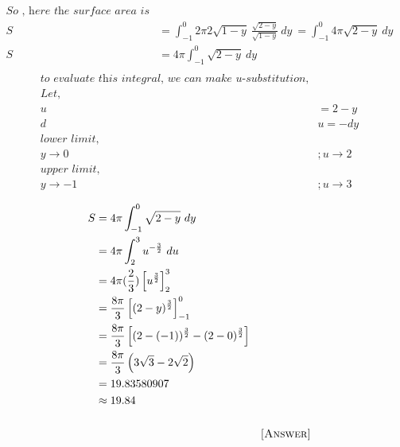 \documentclass[12pt]{article}
\begin{document}
\begin{align*}
\textit{So , here the surface area is}\\
    S &= \int_{-1}^{0} 2\pi 2\sqrt{1-y} \ \frac{\sqrt{2-y}}{\sqrt{1-y}} \ dy \ = \int_{-1}^{0} 4\pi \sqrt{2-y} \ dy\\
    S &= 4 \pi \int_{-1}^{0} \sqrt{2-y} \ dy\\
\end{align*}
\begin{align*}
    \textit{to evaluate this integral, we can make u-substitution,}\\
    Let,&\\
    u&= 2-y\\
    d&u= -dy\\
    \textit{lower limit,} &\\
    y \rightarrow 0 &; u \rightarrow 2 \\
     \textit{upper limit,} &\\
    y \rightarrow -1 &; u \rightarrow 3
\end{align*}

\begin{align*}
    S&= 4 \pi \int_{-1}^{0} \sqrt{2-y} \ dy\\
     &= 4 \pi \int_{2}^{3} u^{-\frac{3}{2}} \ du\\
     &= 4 \pi (\frac{2}{3}) \left [ u^{\frac{3}{2}}\right ]_{2}^{3}\\
     &= \frac{8\pi}{3} \left[(2-y)^{\frac{3}{2}}\right]_{-1}^{0}\\
     &=\frac{8\pi}{3} \left[ (2-(-1))^{\frac{3}{2}} - (2-0)^{\frac{3}{2}} \right]\\
     &= \frac{8\pi}{3} \left(3\sqrt{3} - 2\sqrt{2}\right)\\
     &=19.83580907\\
     &\approx19.84\\\\
     & & \textsc{[Answer]}
\end{align*}

\end{document}
